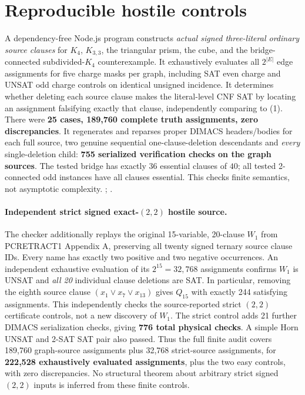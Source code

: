 \documentclass[11pt]{article}
\begin{document}
\section{Reproducible hostile controls}
A dependency-free Node.js program constructs \emph{actual signed
three-literal ordinary source clauses} for $K_4$, $K_{3,3}$,
the triangular prism, the cube, and the bridge-connected
subdivided-$K_4$ counterexample.
It exhaustively evaluates all $2^{|E|}$ edge assignments
for five charge masks per graph, including SAT even charge
and UNSAT odd charge controls on identical unsigned incidence.
It determines whether deleting each source clause makes the
literal-level CNF SAT by locating an assignment falsifying
exactly that clause, independently comparing to (1).
There were \textbf{25 cases, 189,760 complete truth assignments,
zero discrepancies}. It regenerates and reparses proper DIMACS
headers/bodies for each full source, two genuine sequential
one-clause-deletion descendants and \emph{every} single-deletion
child: \textbf{755 serialized verification checks on the graph sources}.
The tested bridge has exactly $36$ essential clauses of $40$;
all tested 2-connected odd instances have all clauses essential.
This checks finite semantics, not asymptotic complexity.
;
.

\paragraph{Independent strict signed exact-$(2,2)$ hostile source.}
The checker additionally replays the original 15-variable,
20-clause $W_1$ from PCRETRACT1 Appendix A, preserving
all twenty signed ternary source clause IDs. Every name has
exactly two positive and two negative occurrences.
An independent exhaustive evaluation of its $2^{15}=32{,}768$
assignments confirms $W_1$ is UNSAT and \emph{all 20}
individual clause deletions are SAT. In particular, removing
the eighth source clause $(x_1\vee x_7\vee x_{13})$
gives $Q_{15}$ with exactly 244 satisfying assignments.
This independently checks the source-reported strict
$(2,2)$ certificate controls, not a new discovery of $W_1$.
The strict control adds 21 further DIMACS serialization
checks, giving \textbf{776 total physical checks}.
A simple Horn UNSAT and 2-SAT SAT pair also passed.
Thus the full finite audit covers 189,760 graph-source
assignments plus 32,768 strict-source assignments,
for \textbf{222,528 exhaustively evaluated assignments},
plus the two easy controls, with zero discrepancies.
No structural theorem about arbitrary strict signed
$(2,2)$ inputs is inferred from these finite controls.
\end{document}
